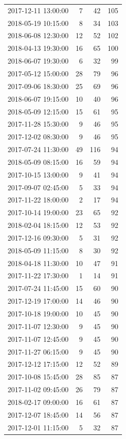 \begin{tabular}{lrrr}
2017-12-11 13:00:00 & 7 & 42 & 105 \\
2018-05-19 10:15:00 & 8 & 34 & 103 \\
2018-06-08 12:30:00 & 12 & 52 & 102 \\
2018-04-13 19:30:00 & 16 & 65 & 100 \\
2018-06-07 19:30:00 & 6 & 32 & 99 \\
2017-05-12 15:00:00 & 28 & 79 & 96 \\
2017-09-06 18:30:00 & 25 & 69 & 96 \\
2018-06-07 19:15:00 & 10 & 40 & 96 \\
2018-05-09 12:15:00 & 15 & 61 & 95 \\
2017-11-28 15:30:00 & 9 & 46 & 95 \\
2017-12-02 08:30:00 & 9 & 46 & 95 \\
2017-07-24 11:30:00 & 49 & 116 & 94 \\
2018-05-09 08:15:00 & 16 & 59 & 94 \\
2017-10-15 13:00:00 & 9 & 41 & 94 \\
2017-09-07 02:45:00 & 5 & 33 & 94 \\
2017-11-22 18:00:00 & 2 & 17 & 94 \\
2017-10-14 19:00:00 & 23 & 65 & 92 \\
2018-02-04 18:15:00 & 12 & 53 & 92 \\
2017-12-16 09:30:00 & 5 & 31 & 92 \\
2018-05-09 11:15:00 & 8 & 30 & 92 \\
2018-04-18 11:30:00 & 10 & 47 & 91 \\
2017-11-22 17:30:00 & 1 & 14 & 91 \\
2017-07-24 11:45:00 & 15 & 60 & 90 \\
2017-12-19 17:00:00 & 14 & 46 & 90 \\
2017-10-18 19:00:00 & 10 & 45 & 90 \\
2017-11-07 12:30:00 & 9 & 45 & 90 \\
2017-11-07 12:45:00 & 9 & 45 & 90 \\
2017-11-27 06:15:00 & 9 & 45 & 90 \\
2017-12-12 17:15:00 & 12 & 52 & 89 \\
2017-10-08 15:45:00 & 28 & 85 & 87 \\
2017-11-02 09:45:00 & 26 & 79 & 87 \\
2018-02-17 09:00:00 & 16 & 61 & 87 \\
2017-12-07 18:45:00 & 14 & 56 & 87 \\
2017-12-01 11:15:00 & 5 & 32 & 87 \\

\end{tabular}

